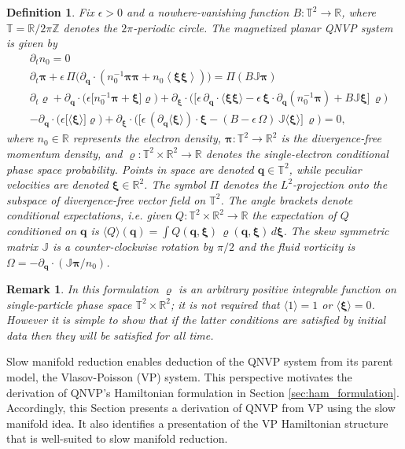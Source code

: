 \documentclass[%
 aip,
 amsmath,amssymb,
reprint, onecolumn %
]{revtex4-1}
\newtheorem{remark}{Remark}
\newtheorem{definition}{Definition}
\begin{document}
\begin{definition}\label{def1} Fix $\epsilon > 0$ and a nowhere-vanishing function $B:\mathbb{T}^2\rightarrow\mathbb{R}$, where $\mathbb{T}=\mathbb{R} /2\pi\mathbb{Z}$ denotes the $2\pi$-periodic circle.  The magnetized planar QNVP system is given by
\begin{align}
&\partial_tn_0 = 0\label{qn_cont}\\
&\partial_t\bm{\pi} + \epsilon\,\Pi\bigg(\partial_{\bm{q}}\cdot(n_0^{-1}\bm{\pi}\bm{\pi} + n_0\left\langle \bm{\xi}\bm{\xi}\right\rangle)\bigg) =   \Pi(B\mathbb{J}\bm{\pi})\label{qn_vorticity}\\
&\partial_t\varrho+ \partial_{\bm{q}}\cdot\bigg(\epsilon\bigg[n_0^{-1}\bm{\pi} + \bm{\xi}\bigg]\varrho\bigg) + \partial_{\bm{\xi}}\cdot\bigg(\bigg[\epsilon\,\partial_{\bm{q}}\cdot\langle \bm{\xi}\bm{\xi}\rangle - \epsilon\,\bm{\xi}\cdot\partial_{\bm{q}}(n_0^{-1}\bm{\pi}) + B\mathbb{J}\bm{\xi}\bigg]\,\varrho\bigg)\nonumber\\
& - \partial_{\bm{q}}\cdot\bigg(\epsilon\bigg[\langle \bm{\xi}\rangle\bigg]\varrho\bigg) + \partial_{\bm{\xi}}\cdot\bigg(\bigg[\epsilon\,(\partial_{\bm{q}}\langle\bm{\xi}\rangle)\cdot\bm{\xi} - (B-\epsilon\,\Omega)\,\mathbb{J}\langle\bm{\xi}\rangle\bigg]\,\varrho\bigg) = 0,\label{qn_kinetic}
\end{align}
where $n_0\in \mathbb{R}$ represents the electron density, $\bm{\pi}:\mathbb{T}^2\rightarrow\mathbb{R}^2$ is the divergence-free momentum density, and $\varrho:\mathbb{T}^2\times\mathbb{R}^2\rightarrow\mathbb{R}$ denotes the single-electron conditional phase space probability. Points in space are denoted $\bm{q}\in\mathbb{T}^2$, while peculiar velocities are denoted $\bm{\xi}\in \mathbb{R}^2$. The symbol $\Pi$ denotes the $L^2$-projection onto the subspace of divergence-free vector field on $\mathbb{T}^2$. The angle brackets denote conditional expectations, i.e. given $Q:\mathbb{T}^2\times\mathbb{R}^2\rightarrow\mathbb{R}$ the expectation of $Q$ conditioned on $\bm{q}$ is $\langle Q\rangle(\bm{q}) = \int Q(\bm{q},\bm{\xi})\,\varrho(\bm{q},\bm{\xi})\,d\bm{\xi}$. The skew symmetric matrix $\mathbb{J}$ is a counter-clockwise rotation by $\pi/2$ and the fluid vorticity is $\Omega = -\partial_{\bm{q}}\cdot (\mathbb{J}\bm{\pi}/n_0)$.
\end{definition}
\begin{remark}
In this formulation $\varrho$ is an arbitrary positive integrable function on single-particle phase space $\mathbb{T}^2\times\mathbb{R}^2$; it is not required that $\langle 1\rangle=1$ or $\langle \bm{\xi}\rangle = 0$. However it is simple to show that if the latter conditions are satisfied by initial data then they will be satisfied for all time.
\end{remark}
Slow manifold reduction enables deduction of the QNVP system from its parent model, the Vlasov-Poisson (VP) system. This perspective motivates the derivation of QNVP's Hamiltonian formulation in Section \ref{sec:ham_formulation}. Accordingly, this Section presents a derivation of QNVP from VP using the slow manifold idea. It also identifies a presentation of the VP Hamiltonian structure that is well-suited to slow manifold reduction.
\end{document}
